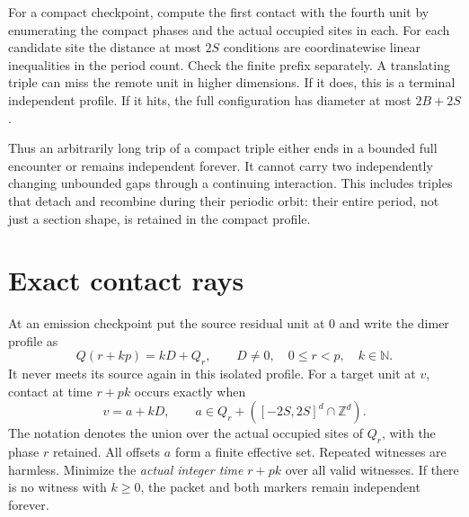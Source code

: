 \documentclass[11pt,letterpaper]{article}
\numberwithin{equation}{section}
\theoremstyle{definition}
\theoremstyle{remark}
\newcommand{\Z}{\mathbb Z}
\newcommand{\NN}{\mathbb N}
\begin{document}
For a compact checkpoint, compute the first contact with the fourth unit by enumerating the compact phases and the actual occupied sites in each. For each candidate site the distance at most $2S$ conditions are coordinatewise linear inequalities in the period count. Check the finite prefix separately. A translating triple can miss the remote unit in higher dimensions. If it does, this is a terminal independent profile. If it hits, the full configuration has diameter at most $2B+2S$.

Thus an arbitrarily long trip of a compact triple either ends in a bounded full encounter or remains independent forever. It cannot carry two independently changing unbounded gaps through a continuing interaction. This includes triples that detach and recombine during their periodic orbit: their entire period, not just a section shape, is retained in the compact profile.

\section{Exact contact rays}\label{smc:zd:sec:rays}
At an emission checkpoint put the source residual unit at $0$ and write the dimer profile as
\[
 Q(r+kp)=kD+Q_r,\qquad D\ne0,\quad 0\le r<p,\quad k\in\NN.
\]
It never meets its source again in this isolated profile. For a target unit at $v$, contact at time $r+pk$ occurs exactly when
\begin{equation}\label{smc:zd:eq:ray}
 v=a+kD,\qquad a\in Q_r+([-2S,2S]^d\cap\Z^d).
\end{equation}
The notation denotes the union over the actual occupied sites of $Q_r$, with the phase $r$ retained. All offsets $a$ form a finite effective set. Repeated witnesses are harmless. Minimize the \emph{actual integer time} $r+pk$ over all valid witnesses. If there is no witness with $k\ge0$, the packet and both markers remain independent forever.
\end{document}
